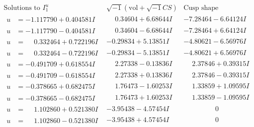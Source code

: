 \documentclass[1p]{elsarticle_modified}
\theoremstyle{definition}
\newcommand{\I}{\sqrt{-1}}
\begin{document}
$$\begin{array}{c|c|c}
\text{Solutions to }I^u_{1}& \I (\text{vol} + \sqrt{-1}CS) & \text{Cusp shape}\\
 \hline 
\begin{aligned}
u &= -1.117790 + 0.404581 I\end{aligned}
 & \phantom{-}0.34604 + 6.68644 I & -7.28464 - 6.64124 I \\ \hline\begin{aligned}
u &= -1.117790 - 0.404581 I\end{aligned}
 & \phantom{-}0.34604 - 6.68644 I & -7.28464 + 6.64124 I \\ \hline\begin{aligned}
u &= \phantom{-}0.332464 + 0.722196 I\end{aligned}
 & -0.29834 + 5.13851 I & -4.80621 - 6.56976 I \\ \hline\begin{aligned}
u &= \phantom{-}0.332464 - 0.722196 I\end{aligned}
 & -0.29834 - 5.13851 I & -4.80621 + 6.56976 I \\ \hline\begin{aligned}
u &= -0.491709 + 0.618554 I\end{aligned}
 & \phantom{-}2.27338 - 0.13836 I & \phantom{-}2.37846 + 0.39315 I \\ \hline\begin{aligned}
u &= -0.491709 - 0.618554 I\end{aligned}
 & \phantom{-}2.27338 + 0.13836 I & \phantom{-}2.37846 - 0.39315 I \\ \hline\begin{aligned}
u &= -0.378665 + 0.682475 I\end{aligned}
 & \phantom{-}1.76473 - 1.60253 I & \phantom{-}1.33859 + 1.09595 I \\ \hline\begin{aligned}
u &= -0.378665 - 0.682475 I\end{aligned}
 & \phantom{-}1.76473 + 1.60253 I & \phantom{-}1.33859 - 1.09595 I \\ \hline\begin{aligned}
u &= \phantom{-}1.102860 + 0.521380 I\end{aligned}
 & -3.95438 - 4.57454 I & \phantom{-0.000000 } 0 \\ \hline\begin{aligned}
u &= \phantom{-}1.102860 - 0.521380 I\end{aligned}
 & -3.95438 + 4.57454 I & \phantom{-0.000000 } 0 \\ \hline\begin{aligned}

\end{aligned}
\end{array}$$
\end{document}
